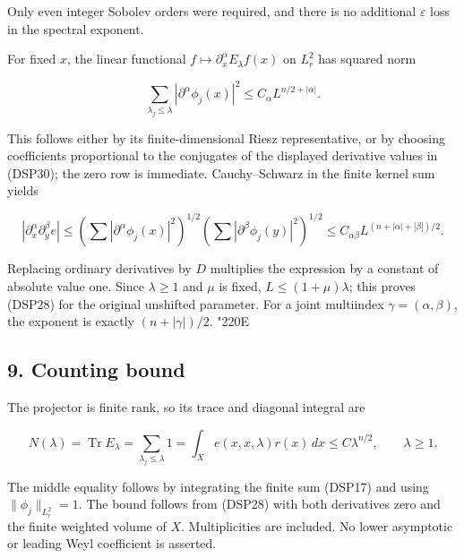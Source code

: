 \documentclass[
  11pt,
]{article}
\makeatletter
\let\ReaderOriginalAnchorStart\hyper@anchorstart
\let\ReaderOriginalAnchorEnd\hyper@anchorend
\let\ReaderPendingAliases\@empty
\def\ReaderArmAliases#1{\gdef\ReaderPendingAliases{#1}}
\def\hyper@anchorstart#1{\ReaderIfNativeAnchorTF{#1}{\ReaderPendingAliases\global\let\ReaderPendingAliases\@empty}{}\ReaderOriginalAnchorStart{#1}}
\makeatother
\begin{document}
Only even integer Sobolev orders were required, and there is no
additional \(\varepsilon\) loss in the spectral exponent.

For fixed \(x\), the linear functional
\(f\mapsto\partial_x^\alpha E_\lambda f(x)\) on \(L^2_r\) has squared
norm

\[
 \sum_{\lambda_j\leq\lambda}|\partial^\alpha\phi_j(x)|^2
 \leq C_\alpha L^{n/2+|\alpha|}.
 \tag{DSP31}
\]

This follows either by its finite-dimensional Riesz representative, or
by choosing coefficients proportional to the conjugates of the displayed
derivative values in (DSP30); the zero row is immediate. Cauchy--Schwarz
in the finite kernel sum yields

\[
 |\partial_x^\alpha\partial_y^\beta e|
 \leq\left(\sum|\partial^\alpha\phi_j(x)|^2\right)^{1/2}
 \left(\sum|\partial^\beta\phi_j(y)|^2\right)^{1/2}
 \leq C_{\alpha\beta}L^{(n+|\alpha|+|\beta|)/2}.
\]

Replacing ordinary derivatives by \(D\) multiplies the expression by a
constant of absolute value one. Since \(\lambda\geq1\) and \(\mu\) is
fixed, \(L\leq(1+\mu)\lambda\); this proves (DSP28) for the original
unshifted parameter. For a joint multiindex \(\gamma=(\alpha,\beta)\),
the exponent is exactly \((n+|\gamma|)/2\). {\ReaderSymbols\char"220E}

\ReaderArmAliases{\ReaderOriginalAnchorStart{AN03-DSP-009}\ReaderOriginalAnchorEnd\begingroup\expandafter\def\csname @currentHref\endcsname{AN03-DSP-009}\label{AN03-DSP-009}\endgroup\ReaderOriginalAnchorStart{an03-dsp-009-counting-bound}\ReaderOriginalAnchorEnd\begingroup\expandafter\def\csname @currentHref\endcsname{an03-dsp-009-counting-bound}\label{an03-dsp-009-counting-bound}\endgroup\ReaderOriginalAnchorStart{9-counting-bound}\ReaderOriginalAnchorEnd\begingroup\expandafter\def\csname @currentHref\endcsname{9-counting-bound}\label{9-counting-bound}\endgroup\ReaderOriginalAnchorStart{counting-bound}\ReaderOriginalAnchorEnd}
\subsection{9. Counting bound}\label{counting-bound}

The projector is finite rank, so its trace and diagonal integral are

\[
 N(\lambda)=\operatorname{Tr}E_\lambda
 =\sum_{\lambda_j\leq\lambda}1
 =\int_X e(x,x,\lambda)r(x)\,dx
 \leq C\lambda^{n/2},\qquad\lambda\geq1.
 \tag{DSP32}
\]

The middle equality follows by integrating the finite sum (DSP17) and
using \(\|\phi_j\|_{L^2_r}=1\). The bound follows from (DSP28) with both
derivatives zero and the finite weighted volume of \(X\). Multiplicities
are included. No lower asymptotic or leading Weyl coefficient is
asserted.
\end{document}
